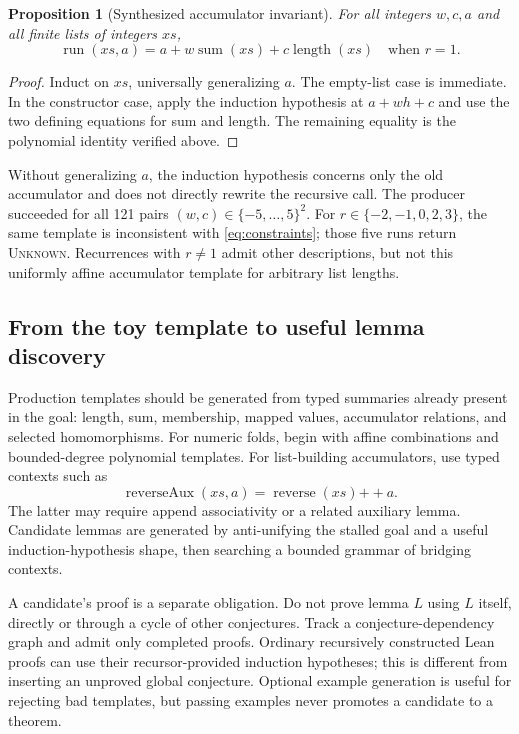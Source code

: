 \documentclass[11pt,a4paper]{article}
\newcommand{\unknown}{\textsc{Unknown}}
\newtheorem{proposition}{Proposition}[section]
\begin{document}
\begin{proposition}[Synthesized accumulator invariant]
For all integers $w,c,a$ and all finite lists of integers $xs$,
\[
 \operatorname{run}(xs,a)=a+w\operatorname{sum}(xs)
                       +c\operatorname{length}(xs)
 \quad\text{when }r=1.
\]
\end{proposition}
\begin{proof}
Induct on $xs$, universally generalizing $a$. The empty-list case is immediate. In the constructor case, apply the induction hypothesis at $a+wh+c$ and use the two defining equations for sum and length. The remaining equality is the polynomial identity verified above.
\end{proof}

Without generalizing $a$, the induction hypothesis concerns only the old accumulator and does not directly rewrite the recursive call. The producer succeeded for all 121 pairs $(w,c)\in\{-5,\ldots,5\}^2$. For $r\in\{-2,-1,0,2,3\}$, the same template is inconsistent with \eqref{eq:constraints}; those five runs return \unknown. Recurrences with $r\ne1$ admit other descriptions, but not this uniformly affine accumulator template for arbitrary list lengths.

\subsection{From the toy template to useful lemma discovery}
Production templates should be generated from typed summaries already present in the goal: length, sum, membership, mapped values, accumulator relations, and selected homomorphisms. For numeric folds, begin with affine combinations and bounded-degree polynomial templates. For list-building accumulators, use typed contexts such as
\[
 \operatorname{reverseAux}(xs,a)
   =\operatorname{reverse}(xs)\mathbin{++}a.
\]
The latter may require append associativity or a related auxiliary lemma. Candidate lemmas are generated by anti-unifying the stalled goal and a useful induction-hypothesis shape, then searching a bounded grammar of bridging contexts.

A candidate's proof is a separate obligation. Do not prove lemma $L$ using $L$ itself, directly or through a cycle of other conjectures. Track a conjecture-dependency graph and admit only completed proofs. Ordinary recursively constructed Lean proofs can use their recursor-provided induction hypotheses; this is different from inserting an unproved global conjecture. Optional example generation is useful for rejecting bad templates, but passing examples never promotes a candidate to a theorem.
\end{document}
